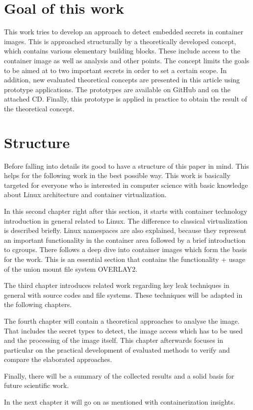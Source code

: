 \section{Goal of this work}
\label{sec:intro:goal}
This work tries to develop an approach to detect embedded secrets in container images. This is approached structurally by a theoretically developed concept, which contains various elementary building blocks. These include access to the container image as well as analysis and other points. The concept limits the goals to be aimed at to two important secrets in order to set a certain scope.
In addition, new evaluated theoretical concepts are presented in this article using prototype applications. The prototypes are available on GitHub and on the attached CD.
Finally, this prototype is applied in practice to obtain the result of the theoretical concept.
%
%
\section{Structure}
\label{sec:intro:structure}
Before falling into details its good to have a structure of this paper in mind. This helps for the following work in the best possible way.
This work is basically targeted for everyone who is interested in computer science with basic knowledge about Linux architecture and container virtualization.

In this second chapter right after this section, it starts with container technology introduction in general related to Linux. The difference to classical virtualization is described briefly. Linux namespaces are also explained, because they represent an important functionality in the container area followed by a brief introduction to cgroups.
There follows a deep dive into container images which form the basis for the work. This is an essential section that contains the functionality + usage of the union mount file system OVERLAY2.

The third chapter introduces related work regarding key leak techniques in general with source codes and file systems. These techniques will be adapted in the following chapters.

The fourth chapter will contain a theoretical approaches to analyse the image. That includes the secret types to detect, the image access which has to be used and the processing of the image itself.
This chapter afterwards focuses in particular on the practical development of evaluated methods to verify and compare the elaborated approaches.

Finally, there will be a summary of the collected results and a solid basis for future scientific work.

In the next chapter it will go on as mentioned with containerization insights.

